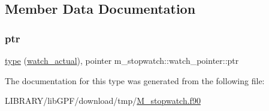 \subsection{Member Data Documentation}
\mbox{\label{structm__stopwatch_1_1watch__pointer_aa8127bec6807a96f87e0bf41502c9290}} 
\subsubsection{\texorpdfstring{ptr}{ptr}}
{\footnotesize\ttfamily \hyperlink{stop__watch_83_8txt_a70f0ead91c32e25323c03265aa302c1c}{type} (\hyperlink{structm__stopwatch_1_1watch__actual}{watch\+\_\+actual}), pointer m\+\_\+stopwatch\+::watch\+\_\+pointer\+::ptr\hspace{0.3cm}{\ttfamily [private]}}



The documentation for this type was generated from the following file\+:\begin{DoxyCompactItemize}
\item 
L\+I\+B\+R\+A\+R\+Y/lib\+G\+P\+F/download/tmp/\hyperlink{M__stopwatch_8f90}{M\+\_\+stopwatch.\+f90}\end{DoxyCompactItemize}
